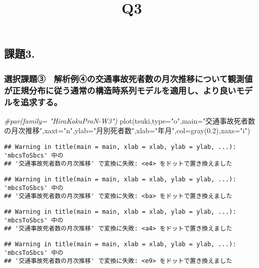 \documentclass[]{article}
\title{Q3}
\author{}
\date{}
\newenvironment{Shaded}{\begin{snugshade}}{\end{snugshade}}
\newcommand{\AttributeTok}[1]{\textcolor[rgb]{0.77,0.63,0.00}{#1}}
\newcommand{\CommentTok}[1]{\textcolor[rgb]{0.56,0.35,0.01}{\textit{#1}}}
\newcommand{\FloatTok}[1]{\textcolor[rgb]{0.00,0.00,0.81}{#1}}
\newcommand{\FunctionTok}[1]{\textcolor[rgb]{0.00,0.00,0.00}{#1}}
\newcommand{\NormalTok}[1]{#1}
\newcommand{\StringTok}[1]{\textcolor[rgb]{0.31,0.60,0.02}{#1}}
\begin{document}
\maketitle

\hypertarget{section}{%
\subsection{課題3.}\label{section}}

\hypertarget{section-1}{%
\subsubsection{選択課題③　解析例④の交通事故死者数の月次推移について観測値が正規分布に従う通常の構造時系列モデルを適用し、より良いモデルを追求する。}\label{section-1}}

\begin{Shaded}
\begin{Highlighting}[]
\CommentTok{\#par(family= "HiraKakuProN{-}W3")}
\FunctionTok{plot}\NormalTok{(tsuki,}\AttributeTok{type=}\StringTok{"o"}\NormalTok{,}\AttributeTok{main=}\StringTok{"交通事故死者数の月次推移"}\NormalTok{,}\AttributeTok{xaxt=}\StringTok{"n"}\NormalTok{,}\AttributeTok{ylab=}\StringTok{"月別死者数"}\NormalTok{,}\AttributeTok{xlab=}\StringTok{"年月"}\NormalTok{,}\AttributeTok{col=}\FunctionTok{gray}\NormalTok{(}\FloatTok{0.2}\NormalTok{),}\AttributeTok{xaxs=}\StringTok{"i"}\NormalTok{)}
\end{Highlighting}
\end{Shaded}

\begin{verbatim}
## Warning in title(main = main, xlab = xlab, ylab = ylab, ...): 'mbcsToSbcs' 中の
## '交通事故死者数の月次推移' で変換に失敗: <e4> をドットで置き換えました
\end{verbatim}

\begin{verbatim}
## Warning in title(main = main, xlab = xlab, ylab = ylab, ...): 'mbcsToSbcs' 中の
## '交通事故死者数の月次推移' で変換に失敗: <ba> をドットで置き換えました
\end{verbatim}

\begin{verbatim}
## Warning in title(main = main, xlab = xlab, ylab = ylab, ...): 'mbcsToSbcs' 中の
## '交通事故死者数の月次推移' で変換に失敗: <a4> をドットで置き換えました
\end{verbatim}

\begin{verbatim}
## Warning in title(main = main, xlab = xlab, ylab = ylab, ...): 'mbcsToSbcs' 中の
## '交通事故死者数の月次推移' で変換に失敗: <e9> をドットで置き換えました
\end{verbatim}
\end{document}
